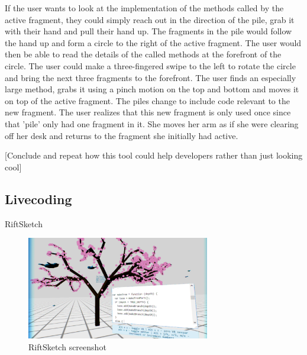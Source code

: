 \documentclass{acm_proc_article-sp}
\begin{document}
    
 If the user wants to look at the implementation of the methods called by the active fragment, they could simply reach out in the direction of the pile, grab it with their hand and pull their hand up. The fragments in the pile would follow the hand up and form a circle to the right of the active fragment. The user would then be able to read the details of the called methods at the forefront of the circle. The user could make a three-fingered swipe to the left to rotate the circle and bring the next three fragments to the forefront.  The user finds an especially large method, grabs it using a pinch motion on the top and bottom and moves it on top of the active fragment. The piles change to include code relevant to the new fragment.  The user realizes that this new fragment is only used once since that 'pile' only had one  fragment in it. She moves her arm as if she were clearing off her desk and returns to the fragment she initially had active.
    
    


[Conclude and repeat how this tool could help developers rather than just looking cool]

\subsection{Livecoding}
RiftSketch

\begin{figure}[ht!]
\centering
\includegraphics[width=80mm]{figures/riftsketch/closer}
\caption{RiftSketch screenshot \label{riftsketch}}
\end{figure}
\end{document}
